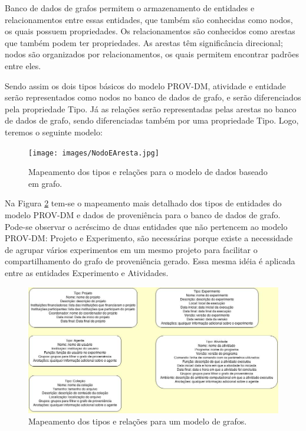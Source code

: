 Banco de dados de grafos permitem o armazenamento de entidades e relacionamentos entre essas entidades, que também são conhecidas como nodos, os quais possuem propriedades. Os relacionamentos são conhecidos como arestas que também podem ter propriedades. As arestas têm significância direcional; nodos são organizados por relacionamentos, os quais permitem encontrar padrões entre eles.

Sendo assim os dois tipos básicos do modelo PROV-DM, atividade e entidade serão representados como nodos no banco de dados de grafo, e serão diferenciados pela propriedade Tipo. Já as relações serão representadas pelas arestas no banco de dados de grafo, sendo diferenciadas também por uma propriedade Tipo. Logo, teremos o seguinte modelo:

\begin{figure}[h!]
\centering
\texttt{[image: images/NodoEAresta.jpg]}
\caption{Mapeamento dos tipos e relações para o modelo de dados baseado em grafo.}
\label{fig:nodoaresta}
\end{figure}

Na Figura \ref{fig:modeloneoj} tem-se o mapeamento mais detalhado dos tipos de entidades do modelo PROV-DM e dados de proveniência para o banco de dados de grafo. Pode-se observar o acréscimo de duas entidades que não pertencem ao modelo PROV-DM: Projeto e Experimento, são necessárias porque existe a necessidade de agrupar vários experimentos em um mesmo projeto para facilitar o compartilhamento do grafo de proveniência gerado. Essa mesma idéia é aplicada entre as entidades Experimento e Atividades.

\begin{figure}[h!]
\centering
\includegraphics[width=450pt]{images/ModeloNeo4J.jpg}
\caption{Mapeamento dos tipos e relações para um modelo de grafos.}
\label{fig:modeloneoj}
\end{figure}

